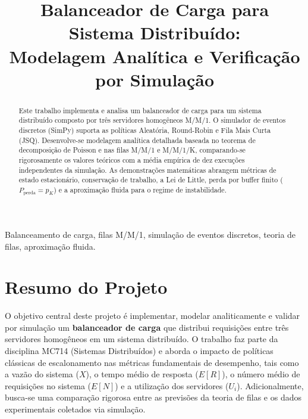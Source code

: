 \documentclass[conference]{IEEEtran}
\begin{document}
\title{\LARGE Balanceador de Carga para Sistema Distribuído:\\
Modelagem Analítica e Verificação por Simulação}

\author{
}

\maketitle

\begin{abstract}
Este trabalho implementa e analisa um balanceador de carga para um sistema distribuído composto por três servidores homogêneos M/M/1. O simulador de eventos discretos (SimPy) suporta as políticas Aleatória, Round-Robin e Fila Mais Curta (JSQ). Desenvolve-se modelagem analítica detalhada baseada no teorema de decomposição de Poisson e nas filas M/M/1 e M/M/1/K, comparando-se rigorosamente os valores teóricos com a média empírica de dez execuções independentes da simulação. As demonstrações matemáticas abrangem métricas de estado estacionário, conservação de trabalho, a Lei de Little, perda por buffer finito ($P_{\text{perda}} = p_K$) e a aproximação fluida para o regime de instabilidade.
\end{abstract}

\begin{keywords}
Balanceamento de carga, filas M/M/1, simulação de eventos discretos, teoria de filas, aproximação fluida.
\end{keywords}

\section{Resumo do Projeto}

O objetivo central deste projeto é implementar, modelar analiticamente e validar por simulação um \textbf{balanceador de carga} que distribui requisições entre três servidores homogêneos em um sistema distribuído. O trabalho faz parte da disciplina MC714 (Sistemas Distribuídos) e aborda o impacto de políticas clássicas de escalonamento nas métricas fundamentais de desempenho, tais como a vazão do sistema ($X$), o tempo médio de resposta ($E[R]$), o número médio de requisições no sistema ($E[N]$) e a utilização dos servidores ($U_i$). Adicionalmente, busca-se uma comparação rigorosa entre as previsões da teoria de filas e os dados experimentais coletados via simulação.
\end{document}
